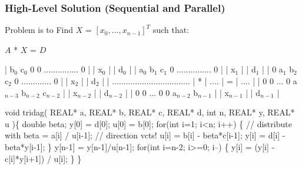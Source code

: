 \documentclass{beamer}
\newcommand{\emp}[1]{\textcolor{DikuRed}{ #1}}
\newcommand{\mymath}[1]{$ #1 $}
\newcommand{\myindx}[1]{_{#1}}
\begin{document}
\begin{frame}[fragile,t]
  \frametitle{High-Level Solution (Sequential and Parallel)}

\begin{block}{Problem is to Find $X$ = $[x_0, ..., x_{n-1}]^T$ such that:} 

\begin{colorcode}[fontsize=\scriptsize]
                   \emp{\mymath{A}                   *    \mymath{X}     =    \mymath{D}}

 | b\mymath{\myindx{0}}  c\mymath{\myindx{0}}  0   0    ............... 0 |   | x\mymath{\myindx{0}}   |   | d\mymath{\myindx{0}}   |
 | a\mymath{\myindx{0}}  b\mymath{\myindx{1}}  c\mymath{\myindx{1}}  0    ............... 0 |   | x\mymath{\myindx{1}}   |   | d\mymath{\myindx{1}}   |
 | 0   a\mymath{\myindx{1}}  b\mymath{\myindx{2}}  c\mymath{\myindx{2}}  0  ............. 0 |   | x\mymath{\myindx{2}}   |   | d\mymath{\myindx{2}}   |
 | .................................. | * | .... | = | .... |
 | 0    0  ...    0    a\mymath{\myindx{n-3}} b\mymath{\myindx{n-2}} c\mymath{\myindx{n-2}} |   | x\mymath{\myindx{n-2}} |   | d\mymath{\myindx{n-2}} |
 | 0    0  ...    0    0    a\mymath{\myindx{n-2}} b\mymath{\myindx{n-1}} |   | x\mymath{\myindx{n-1}} |   | d\mymath{\myindx{n-1}} |
\end{colorcode}
\end{block}

\begin{colorcode}[fontsize=\scriptsize]
void tridag( REAL* a, REAL* b, REAL* c, REAL* d, int n, REAL* y, REAL* u )\{
    double beta;
    y[0] = d[0];   u[0] = b[0];
    for(int i=1; i<n; i++) \{     // distribute with
        beta = a[i] / u[i-1];     // direction vcts!
        u[i] = b[i] - beta*c[i-1];
        y[i] = d[i] - beta*y[i-1];
    \}
    y[n-1] = y[n-1]/u[n-1];
    for(int i=n-2; i>=0; i--) \{
        y[i] = (y[i] - c[i]*y[i+1]) / u[i];
\}  \}
\end{colorcode}

\end{frame}
\end{document}
